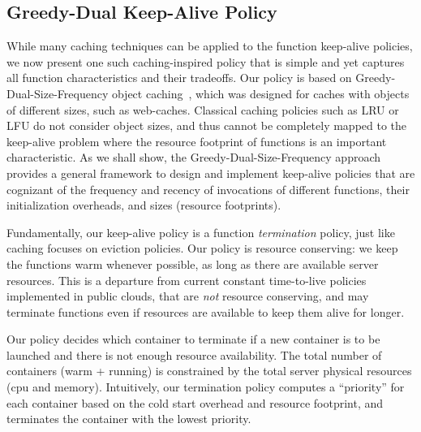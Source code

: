 


\vspace*{\subsecspace}
\subsection{Greedy-Dual Keep-Alive Policy}
\vspace*{\subsecspace}

While many caching techniques can be applied to the function keep-alive policies, we now present one such caching-inspired policy that is simple and yet captures all function characteristics and their tradeoffs.
Our policy is based on Greedy-Dual-Size-Frequency object caching~\cite{gdsf}, which was designed for caches with objects of  different sizes, such as web-caches. 
Classical caching policies such as LRU or LFU do not consider object sizes, and thus cannot be completely mapped to the keep-alive problem where the resource footprint of functions is an important characteristic. 
As we shall show, the Greedy-Dual-Size-Frequency approach provides a general framework to design and implement keep-alive policies that are cognizant of the  frequency and recency of invocations of different functions, their initialization overheads, and sizes (resource footprints). 



Fundamentally, our keep-alive policy is a function \emph{termination} policy, just like caching focuses on eviction policies. 
%
Our policy is resource conserving: we keep the functions warm whenever possible, as long as there are available server resources.
%
This is a departure from current constant time-to-live policies implemented in public clouds, that are \emph{not} resource conserving, and may terminate functions even if resources are available to keep them alive for longer. 

Our policy decides which container to terminate if a new container is to be launched and there is not enough resource availability.
%
The total number of containers (warm + running) is constrained by the total server physical resources (cpu and memory). 
%
Intuitively, our termination policy computes a ``priority'' for each container based on the cold start overhead and resource footprint, and terminates the container with the lowest priority.
%


